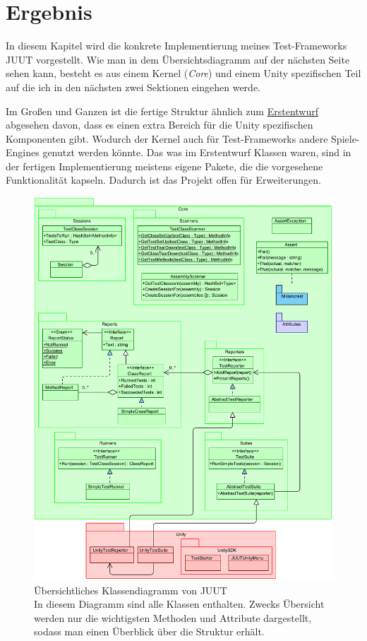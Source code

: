 \chapter{Ergebnis}

In diesem Kapitel wird die konkrete Implementierung meines Test-Frameworks JUUT vorgestellt. Wie man in dem Übersichtsdiagramm auf der nächsten Seite sehen kann, besteht es aus einem Kernel (\textit{Core}) und einem Unity spezifischen Teil auf die ich in den nächsten zwei Sektionen eingehen werde.

Im Großen und Ganzen ist die fertige Struktur ähnlich zum \hyperref[fig:WalkingSkeleton]{Erstentwurf} abgesehen davon, dass es einen extra Bereich für die Unity spezifischen Komponenten gibt. Wodurch der Kernel auch für Test-Frameworks andere Spiele-Engines genutzt werden könnte. Das was im Erstentwurf Klassen waren, sind in der fertigen Implementierung meistens eigene Pakete, die die vorgesehene Funktionalität kapseln. Dadurch ist das Projekt offen für Erweiterungen.

\clearpage
\begin{figure}
\centering
\includegraphics[width=0.9\linewidth]{images/Kapitel_Ergebnis/Overview}
\caption[Übersichtliches Klassendiagramm von JUUT]{Übersichtliches Klassendiagramm von JUUT\\
In diesem Diagramm sind alle Klassen enthalten. Zwecks Übersicht werden nur die wichtigsten Methoden und Attribute dargestellt, sodass man einen Überblick über die Struktur erhält.}
\label{fig:Overview}
\end{figure}
\clearpage

